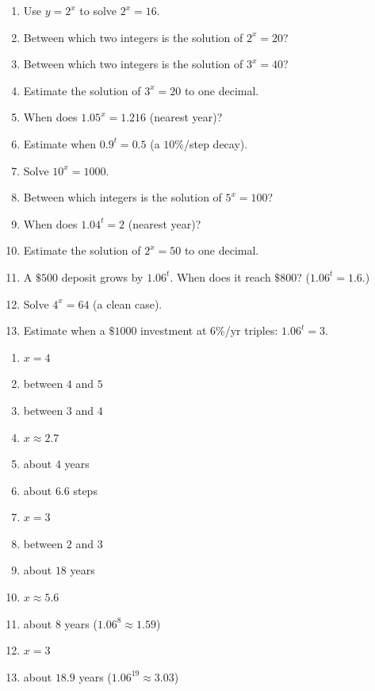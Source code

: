 \documentclass[11pt]{article}
\begin{document}
\begin{recapbox}
\begin{multicols}{2}
\small
\begin{enumerate}[leftmargin=*,itemsep=3pt]
  \item Use $y=2^{x}$ to solve $2^{x}=16$.
  \item Between which two integers is the solution of $2^{x}=20$?
  \item Between which two integers is the solution of $3^{x}=40$?
  \item Estimate the solution of $3^{x}=20$ to one decimal.
  \item When does $1.05^{x}=1.216$ (nearest year)?
  \item Estimate when $0.9^{t}=0.5$ (a $10\%$/step decay).
  \item Solve $10^{x}=1000$.
  \item Between which integers is the solution of $5^{x}=100$?
  \item When does $1.04^{t}=2$ (nearest year)?
  \item Estimate the solution of $2^{x}=50$ to one decimal.
  \item A $\$500$ deposit grows by $1.06^{t}$. When does it reach $\$800$? ($1.06^{t}=1.6$.)
  \item Solve $4^{x}=64$ (a clean case).
  \item Estimate when a $\$1000$ investment at $6\%$/yr triples: $1.06^{t}=3$.
\end{enumerate}
\end{multicols}
\end{recapbox}

\begin{keybox}
\begin{multicols}{2}
\small
\begin{enumerate}[leftmargin=*,itemsep=3pt]
  \item $x=4$
  \item between $4$ and $5$
  \item between $3$ and $4$
  \item $x\approx2.7$
  \item about $4$ years
  \item about $6.6$ steps
  \item $x=3$
  \item between $2$ and $3$
  \item about $18$ years
  \item $x\approx5.6$
  \item about $8$ years ($1.06^{8}\approx1.59$)
  \item $x=3$
  \item about $18.9$ years ($1.06^{19}\approx3.03$)
\end{enumerate}
\end{multicols}
\end{keybox}
\end{document}

